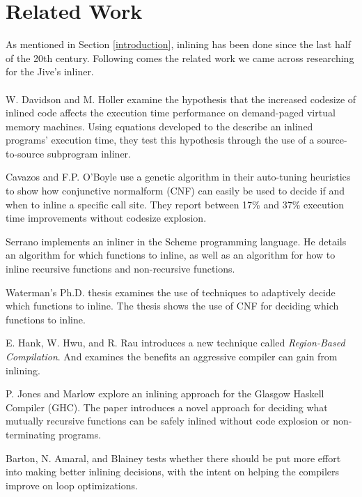 
\section{Related Work}

As mentioned in Section \ref{introduction}, inlining has been done since the
last half of the 20th century. Following comes the related work we came across
researching for the Jive's inliner.

\paragraph{}

W. Davidson and M. Holler \cite{SubprogInlining} examine the hypothesis that
the increased codesize of inlined code affects the execution time performance on
demand-paged virtual memory machines. Using equations developed to the describe
an inlined programs' execution time, they test this hypothesis through the use
of a source-to-source subprogram inliner.

Cavazos and F.P. O'Boyle \cite{AutoTuningJavaHeuristics} use a genetic algorithm
in their auto-tuning heuristics to show how conjunctive normalform (CNF) can
easily be used to decide if and when to inline a specific call site. They report
between 17\% and 37\% execution time improvements without codesize explosion.

Serrano \cite{InlineWhenHowSerrano} implements an inliner in the Scheme
programming language. He details an algorithm for which functions to inline, as
well as an algorithm for how to inline recursive functions and non-recursive
functions.

Waterman's Ph.D. thesis \cite{AdaptvCompilAndInlingWaterman} examines the use of
techniques to adaptively decide which functions to inline. The thesis shows the
use of CNF for deciding which functions to inline.

E. Hank, W. Hwu, and R. Rau \cite{RegionBasedCompilationIntroduction} introduces
a new technique called \textit{Region-Based Compilation}. And examines the
benefits an aggressive compiler can gain from inlining.

P. Jones and Marlow \cite{GHCPaper} explore an inlining approach for the Glasgow
Haskell Compiler (GHC). The paper introduces a novel approach for deciding what
mutually recursive functions can be safely inlined without code explosion or
non-terminating programs.

Barton, N. Amaral, and Blainey \cite{ShouldLoopOptsInfluenceInlining} tests
whether there should be put more effort into making better inlining decisions,
with the intent on helping the compilers improve on loop optimizations.

